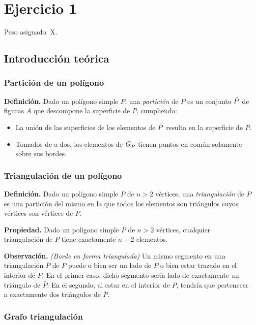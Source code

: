 \section{Ejercicio 1}

Peso asignado: X.

\subsection{Introducción teórica}

\subsubsection{Partición de un polígono}

\textbf{Definición.} Dado un polígono simple $P$, una \textit{partición} de $P$ es un conjunto $\bar{P}$ de figuras $A$ que descompone la superficie de $P$, cumpliendo:
\begin{itemize}
\setlength\itemsep{0em}
\item La unión de las superficies de los elementos de $\bar{P}$ resulta en la superficie de $P$.
\item Tomados de a dos, los elementos de $G_{\bar{P}}$ tienen puntos en común solamente sobre sus bordes.
\end{itemize}

\subsubsection{Triangulación de un polígono}

\textbf{Definición.} Dado un polígono simple $P$ de $n > 2$ vértices, una \textit{triangulación} de $P$ es una partición del mismo en la que todos los elementos son triángulos cuyos vértices son vértices de $P$. 

\medskip

\textbf{Propiedad.} Dado un polígono simple $P$ de $n > 2$ vértices, cualquier triangulación de $P$ tiene exactamente $n-2$ elementos.

\medskip

\textbf{Observación.} \textit{(Borde en forma triangulada)} Un mismo segmento en una triangulación $\bar{P}$ de $P$ puede o bien ser un lado de $P$ o bien estar trazado en el interior de $P$. En el primer caso, dicho segmento sería lado de exactamente un triángulo de $\bar{P}$. En el segundo, al estar en el interior de $P$, tendría que pertenecer a exactamente dos triángulos de $\bar{P}$.

\subsubsection{Grafo triangulación}

